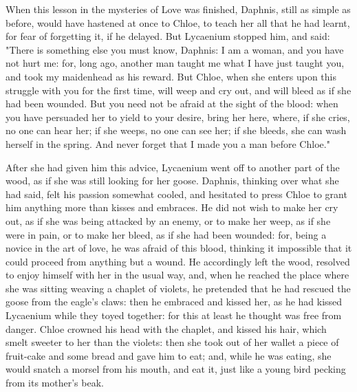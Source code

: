 \documentclass{book}
\begin{document}
\begin{pairs}
\begin{Rightside}
\begin{english}
  When this lesson in the mysteries of Love was finished, Daphnis, still as simple as before, would have hastened at once to Chloe, to teach her all that he had learnt, for fear of forgetting it, if he delayed.  But Lycaenium stopped him, and said: "There is something else you must know, Daphnis: I am a woman, and you have not hurt me: for, long ago, another man taught me what I have just taught you, and took my maidenhead as his reward.  But Chloe, when she enters upon this struggle with you for the first time, will weep and cry out, and will bleed as if she had been wounded.  But you need not be afraid at the sight of the blood: when you have persuaded her to yield to your desire, bring her here, where, if she cries, no one can hear her; if she weeps, no one can see her; if she bleeds, she can wash herself in the spring.  And never forget that I made you a man before Chloe."
\pend


  After she had given him this advice, Lycaenium went off to another part of the wood, as if she was still looking for her goose.  Daphnis, thinking over what she had said, felt his passion somewhat cooled, and hesitated to press Chloe to grant him anything more than kisses and embraces.  He did not wish to make her cry out, as if she was being attacked by an enemy, or to make her weep, as if she were in pain, or to make her bleed, as if she had been wounded: for, being a novice in the art of love, he was afraid of this blood, thinking it impossible that it could proceed from anything but a wound.  He accordingly left the wood, resolved to enjoy himself with her in the usual way, and, when he reached the place where she was sitting weaving a chaplet of violets, he pretended that he had rescued the goose from the eagle's claws: then he embraced and kissed her, as he had kissed Lycaenium while they toyed together: for this at least he thought was free from danger.  Chloe crowned his head with the chaplet, and kissed his hair, which smelt sweeter to her than the violets: then she took out of her wallet a piece of fruit-cake and some bread and gave him to eat; and, while he was eating, she would snatch a morsel from his mouth, and eat it, just like a young bird pecking from its mother's beak.
\pend



\end{english}
\end{Rightside}
\end{pairs}
\end{document}
